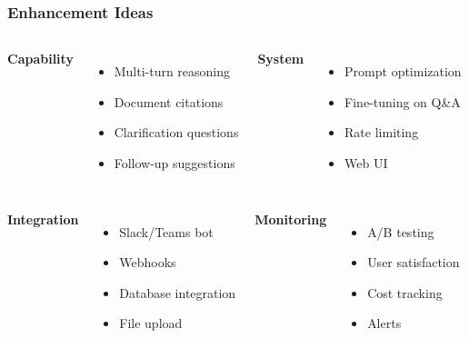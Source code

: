 \documentclass[aspectratio=169,11pt]{beamer}
\begin{document}
\begin{frame}
  \frametitle{Enhancement Ideas}

  \begin{columns}[T]
    \textbf{Capability}
    \begin{itemize}
      \item Multi-turn reasoning
      \item Document citations
      \item Clarification questions
      \item Follow-up suggestions
    \end{itemize}

    \textbf{System}
    \begin{itemize}
      \item Prompt optimization
      \item Fine-tuning on Q\&A
      \item Rate limiting
      \item Web UI
    \end{itemize}
  \end{columns}

  \begin{columns}[T]
    \textbf{Integration}
    \begin{itemize}
      \item Slack/Teams bot
      \item Webhooks
      \item Database integration
      \item File upload
    \end{itemize}

    \textbf{Monitoring}
    \begin{itemize}
      \item A/B testing
      \item User satisfaction
      \item Cost tracking
      \item Alerts
    \end{itemize}
  \end{columns}
\end{frame}
\end{document}

